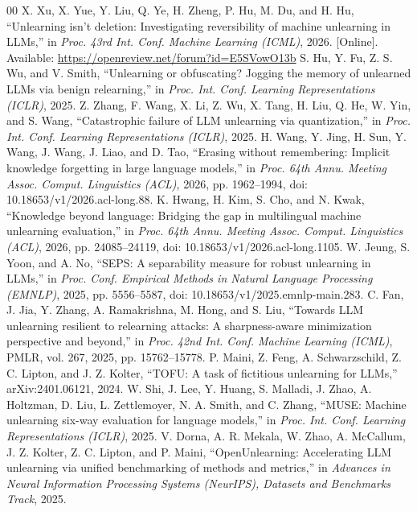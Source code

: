 \documentclass[conference]{IEEEtran}
\begin{document}
\begin{thebibliography}{00}
 X. Xu, X. Yue, Y. Liu, Q. Ye, H. Zheng, P. Hu, M. Du, and H. Hu, ``Unlearning isn't deletion: Investigating reversibility of machine unlearning in LLMs,'' in \textit{Proc. 43rd Int. Conf. Machine Learning (ICML)}, 2026. [Online]. Available: \url{https://openreview.net/forum?id=E5SVowO13b}
 S. Hu, Y. Fu, Z. S. Wu, and V. Smith, ``Unlearning or obfuscating? Jogging the memory of unlearned LLMs via benign relearning,'' in \textit{Proc. Int. Conf. Learning Representations (ICLR)}, 2025.
 Z. Zhang, F. Wang, X. Li, Z. Wu, X. Tang, H. Liu, Q. He, W. Yin, and S. Wang, ``Catastrophic failure of LLM unlearning via quantization,'' in \textit{Proc. Int. Conf. Learning Representations (ICLR)}, 2025.
 H. Wang, Y. Jing, H. Sun, Y. Wang, J. Wang, J. Liao, and D. Tao, ``Erasing without remembering: Implicit knowledge forgetting in large language models,'' in \textit{Proc. 64th Annu. Meeting Assoc. Comput. Linguistics (ACL)}, 2026, pp. 1962--1994, doi: 10.18653/v1/2026.acl-long.88.
 K. Hwang, H. Kim, S. Cho, and N. Kwak, ``Knowledge beyond language: Bridging the gap in multilingual machine unlearning evaluation,'' in \textit{Proc. 64th Annu. Meeting Assoc. Comput. Linguistics (ACL)}, 2026, pp. 24085--24119, doi: 10.18653/v1/2026.acl-long.1105.
 W. Jeung, S. Yoon, and A. No, ``SEPS: A separability measure for robust unlearning in LLMs,'' in \textit{Proc. Conf. Empirical Methods in Natural Language Processing (EMNLP)}, 2025, pp. 5556--5587, doi: 10.18653/v1/2025.emnlp-main.283.
 C. Fan, J. Jia, Y. Zhang, A. Ramakrishna, M. Hong, and S. Liu, ``Towards LLM unlearning resilient to relearning attacks: A sharpness-aware minimization perspective and beyond,'' in \textit{Proc. 42nd Int. Conf. Machine Learning (ICML)}, PMLR, vol. 267, 2025, pp. 15762--15778.
 P. Maini, Z. Feng, A. Schwarzschild, Z. C. Lipton, and J. Z. Kolter, ``TOFU: A task of fictitious unlearning for LLMs,'' arXiv:2401.06121, 2024.
 W. Shi, J. Lee, Y. Huang, S. Malladi, J. Zhao, A. Holtzman, D. Liu, L. Zettlemoyer, N. A. Smith, and C. Zhang, ``MUSE: Machine unlearning six-way evaluation for language models,'' in \textit{Proc. Int. Conf. Learning Representations (ICLR)}, 2025.
 V. Dorna, A. R. Mekala, W. Zhao, A. McCallum, J. Z. Kolter, Z. C. Lipton, and P. Maini, ``OpenUnlearning: Accelerating LLM unlearning via unified benchmarking of methods and metrics,'' in \textit{Advances in Neural Information Processing Systems (NeurIPS), Datasets and Benchmarks Track}, 2025.

\end{thebibliography}
\end{document}
